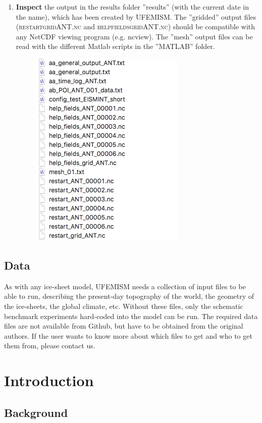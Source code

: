\documentclass{article}
\begin{document}
\begin{enumerate}
  \item \textbf{Inspect} the output in the results folder ''results'' (with the current date in the name), which has been created by UFEMISM. The ''gridded'' output files (\textsc{restart\textunderscore grid\textunderscore ANT.nc} and \textsc{help\textunderscore fields\textunderscore grid\textunderscore ANT.nc}) should be compatible with any NetCDF viewing program (e.g. ncview). The ''mesh'' output files can be read with the different Matlab scripts in the ''MATLAB'' folder.

  \begin{figure}[H]
    \centering
    \includegraphics[width=0.4\linewidth]{Fig_howto_06.png}
  \end{figure}

\end{enumerate}

\subsection{Data}

As with any ice-sheet model, UFEMISM needs a collection of input files to be able to run, describing the present-day topography of the world, the geometry of the ice-sheets, the global climate, etc. Without these files, only the schematic benchmark experiments hard-coded into the model can be run. The required data files are not available from Github, but have to be obtained from the original authors. If the user wants to know more about which files to get and who to get them from, please contact us.

\newpage
\section{Introduction}

\subsection{Background}
\end{document}
